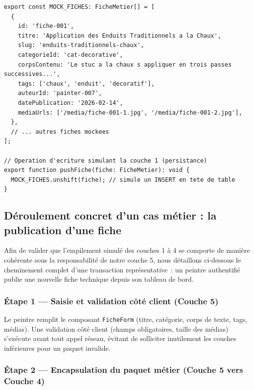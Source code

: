 \documentclass[12pt,a4paper]{report}
\begin{document}
\begin{lstlisting}[caption={\texttt{data/mockFiches.ts} --- extrait du jeu de données simulant la couche 1 (Infrastructure)}]
export const MOCK_FICHES: FicheMetier[] = [
  {
    id: 'fiche-001',
    titre: 'Application des Enduits Traditionnels a la Chaux',
    slug: 'enduits-traditionnels-chaux',
    categorieId: 'cat-decorative',
    corpsContenu: 'Le stuc a la chaux s appliquer en trois passes successives...',
    tags: ['chaux', 'enduit', 'decoratif'],
    auteurId: 'painter-007',
    datePublication: '2026-02-14',
    mediaUrls: ['/media/fiche-001-1.jpg', '/media/fiche-001-2.jpg'],
  },
  // ... autres fiches mockees
];

// Operation d'ecriture simulant la couche 1 (persistance)
export function pushFiche(fiche: FicheMetier): void {
  MOCK_FICHES.unshift(fiche); // simule un INSERT en tete de table
}
\end{lstlisting}

\subsection{Déroulement concret d'un cas métier : la publication d'une fiche}

Afin de valider que l'empilement simulé des couches 1 à 4 se comporte de manière cohérente sous la responsabilité de notre couche 5, nous détaillons ci-dessous le cheminement complet d'une transaction représentative~: un peintre authentifié publie une nouvelle fiche technique depuis son tableau de bord.

\subsubsection*{Étape 1 --- Saisie et validation côté client (Couche 5)}

Le peintre remplit le composant \texttt{FicheForm} (titre, catégorie, corps de texte, tags, médias). Une validation côté client (champs obligatoires, taille des médias) s'exécute avant tout appel réseau, évitant de solliciter inutilement les couches inférieures pour un paquet invalide.

\subsubsection*{Étape 2 --- Encapsulation du paquet métier (Couche 5 vers Couche 4)}
\end{document}
